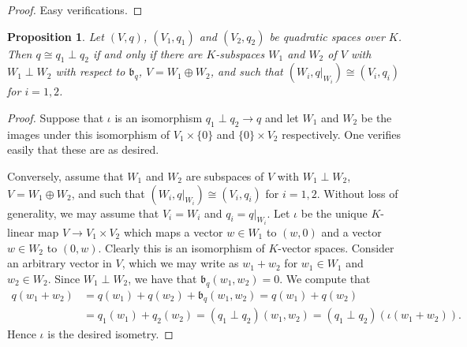 \documentclass[12pt, leqno, british]{amsart}
\theoremstyle{definition}
\theoremstyle{plain}
\newtheorem{prop}[defi]{Proposition}
\theoremstyle{remark}
\newcommand{\mf}{\mathfrak}
\begin{document}
\begin{proof}
Easy verifications.
\end{proof}
\begin{prop}\label{P:intrinsic-orth-sum}
Let $(V, q)$, $(V_1, q_1)$ and $(V_2, q_2)$ be quadratic spaces over $K$.
Then $q \cong q_1 \perp q_2$ if and only if there are $K$-subspaces $W_1$ and $W_2$ of $V$ with $W_1 \perp W_2$ with respect to $\mf{b}_q$, $V = W_1 \oplus W_2$, and such that $(W_i, q\vert_{W_i}) \cong (V_i, q_i)$ for $i = 1, 2$.
\end{prop}
\begin{proof}
Suppose that $\iota$ is an isomorphism $q_1 \perp q_2 \to q$ and let $W_1$ and $W_2$ be the images under this isomorphism of $V_1 \times \lbrace 0 \rbrace$ and $\lbrace 0 \rbrace \times V_2$ respectively. One verifies easily that these are as desired.

Conversely, assume that $W_1$ and $W_2$ are subspaces of $V$ with $W_1 \perp W_2$, $V = W_1 \oplus W_2$, and such that $(W_i, q\vert_{W_i}) \cong (V_i, q_i)$ for $i = 1, 2$.
Without loss of generality, we may assume that $V_i = W_i$ and $q_i = q\vert_{W_i}$.
Let $\iota$ be the unique $K$-linear map $V \to V_1 \times V_2$ which maps a vector $w \in W_1$ to $(w, 0)$ and a vector $w \in W_2$ to $(0, w)$.
Clearly this is an isomorphism of $K$-vector spaces.
Consider an arbitrary vector in $V$, which we may write as $w_1 + w_2$ for $w_1 \in W_1$ and $w_2 \in W_2$.
Since $W_1 \perp W_2$, we have that $\mf{b}_q(w_1, w_2) = 0$. We compute that
\begin{align*}
q(w_1 + w_2) &= q(w_1) + q(w_2) + \mf{b}_q(w_1, w_2) = q(w_1) + q(w_2) \\
&= q_1(w_1) + q_2(w_2) = (q_1 \perp q_2)(w_1, w_2) = (q_1 \perp q_2)(\iota(w_1 + w_2)).
\end{align*}
Hence $\iota$ is the desired isometry.
\end{proof}
\end{document}

